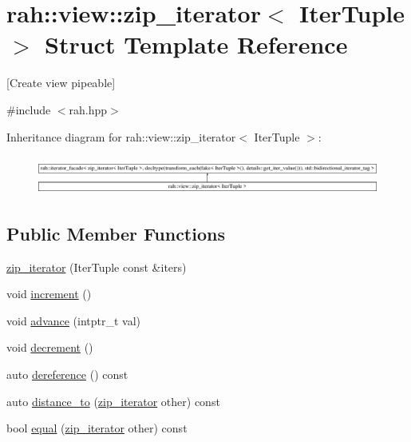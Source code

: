 \hypertarget{structrah_1_1view_1_1zip__iterator}{}\section{rah\+::view\+::zip\+\_\+iterator$<$ Iter\+Tuple $>$ Struct Template Reference}
\label{structrah_1_1view_1_1zip__iterator}


\mbox{[}Create view pipeable\mbox{]}  




{\ttfamily \#include $<$rah.\+hpp$>$}

Inheritance diagram for rah\+::view\+::zip\+\_\+iterator$<$ Iter\+Tuple $>$\+:\begin{figure}[H]
\begin{center}
\leavevmode
\includegraphics[height=1.291811cm]{structrah_1_1view_1_1zip__iterator}
\end{center}
\end{figure}
\subsection*{Public Member Functions}
\begin{DoxyCompactItemize}
\item 
\mbox{\hyperlink{structrah_1_1view_1_1zip__iterator_a2f6b7c790bcb819a68e4828f6bd6ef79}{zip\+\_\+iterator}} (Iter\+Tuple const \&iters)
\item 
void \mbox{\hyperlink{structrah_1_1view_1_1zip__iterator_a156b181d725c31af3c34180806d6428e}{increment}} ()
\item 
void \mbox{\hyperlink{structrah_1_1view_1_1zip__iterator_abc9b6f7ff787d1a08c4a327d738a1809}{advance}} (intptr\+\_\+t val)
\item 
void \mbox{\hyperlink{structrah_1_1view_1_1zip__iterator_a5618c02a5596c1306d1abc0b1413f086}{decrement}} ()
\item 
auto \mbox{\hyperlink{structrah_1_1view_1_1zip__iterator_a775ecbdf57e02dd926e5b83f0a3bd8c1}{dereference}} () const
\item 
auto \mbox{\hyperlink{structrah_1_1view_1_1zip__iterator_a01c298bede994df318d47205c50cc461}{distance\+\_\+to}} (\mbox{\hyperlink{structrah_1_1view_1_1zip__iterator}{zip\+\_\+iterator}} other) const
\item 
bool \mbox{\hyperlink{structrah_1_1view_1_1zip__iterator_ab8712d7266cdc63143e61841fa371179}{equal}} (\mbox{\hyperlink{structrah_1_1view_1_1zip__iterator}{zip\+\_\+iterator}} other) const
\end{DoxyCompactItemize}
